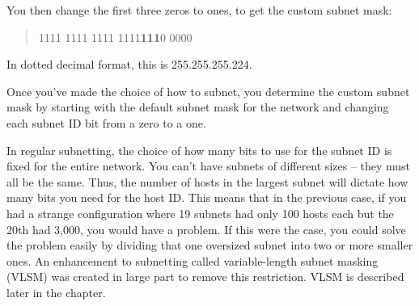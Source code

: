You then change the first three zeros to ones, to get the custom subnet mask:

\begin{quote}
1111 1111 1111 1111\quad \textbf{111}0 0000
\end{quote}
In dotted decimal format, this is 255.255.255.224.


\begin{note}
Once you've made the choice of how to subnet, you determine the custom subnet mask by starting with
the default subnet mask for the network and changing each subnet ID bit from a zero to a one.
\end{note}

\begin{note}
In regular subnetting, the choice of how many bits to use for the subnet ID is fixed for the entire network.
You can't have subnets of different sizes -- they must all be the same.
Thus, the number of hosts in the largest subnet will dictate how many bits you need for the host ID.
This means that in the previous case, if you had a strange configuration where 19 subnets had only 100 hosts each but the 20th had 3,000, you would have a problem.
If this were the case, you could solve the problem easily by dividing that one oversized subnet into two or more smaller ones.
An enhancement to subnetting called variable-length subnet masking (VLSM) was created in large part to remove this restriction.
VLSM is described later in the chapter.
\end{note}


